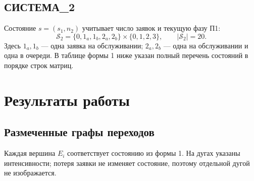 \documentclass[12pt,a4paper]{article}
\begin{document}
\subsection{СИСТЕМА\_2}
Состояние $s=(s_1,n_2)$ учитывает число заявок и текущую фазу П1:
\begin{equation}
\mathcal S_2=\{0,1_a,1_b,2_a,2_b\}\times\{0,1,2,3\},\qquad |\mathcal S_2|=20.
\end{equation}
Здесь $1_a,1_b$ --- одна заявка на обслуживании; $2_a,2_b$ --- одна на обслуживании и одна в очереди. В таблице формы 1 ниже указан полный перечень состояний в порядке строк матриц.
\newpage

\section{Результаты работы}
\subsection{Размеченные графы переходов}
Каждая вершина $E_i$ соответствует состоянию из формы 1. На дугах указаны интенсивности; потеря заявки не изменяет состояние, поэтому отдельной дугой не изображается.
\end{document}
